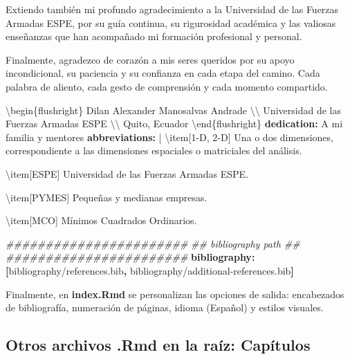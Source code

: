\documentclass[a4paper, nobind]{templates/ociamthesis}
\newenvironment{Shaded}{\begin{snugshade}}{\end{snugshade}}
\newcommand{\AttributeTok}[1]{\textcolor[rgb]{0.13,0.29,0.53}{#1}}
\newcommand{\CharTok}[1]{\textcolor[rgb]{0.31,0.60,0.02}{#1}}
\newcommand{\CommentTok}[1]{\textcolor[rgb]{0.56,0.35,0.01}{\textit{#1}}}
\newcommand{\FunctionTok}[1]{\textcolor[rgb]{0.13,0.29,0.53}{\textbf{#1}}}
\newcommand{\KeywordTok}[1]{\textcolor[rgb]{0.13,0.29,0.53}{\textbf{#1}}}
\newcommand{\NormalTok}[1]{#1}
\renewenvironment{Shaded}
{
  \vspace{10pt}%
  \begin{snugshade}%
}{%
  \end{snugshade}%
  \vspace{8pt}%
}
\begin{document}
\begin{Shaded}
\begin{Highlighting}[]
\NormalTok{  Extiendo también mi profundo agradecimiento a la Universidad de las Fuerzas Armadas ESPE, por su guía continua, su rigurosidad académica y las valiosas enseñanzas que han acompañado mi formación profesional y personal.}
  
\NormalTok{  Finalmente, agradezco de corazón a mis seres queridos por su apoyo incondicional, su paciencia y su confianza en cada etapa del camino. Cada palabra de aliento, cada gesto de comprensión y cada momento compartido.}
  
  
\NormalTok{  \textbackslash{}begin\{flushright\}}
\NormalTok{  Dilan Alexander Manosalvas Andrade \textbackslash{}\textbackslash{}}
\NormalTok{  Universidad de las Fuerzas Armadas ESPE \textbackslash{}\textbackslash{}}
\NormalTok{  Quito, Ecuador}
\NormalTok{  \textbackslash{}end\{flushright\}}
\FunctionTok{dedication}\KeywordTok{:}\AttributeTok{ A mi familia y mentores}
\FunctionTok{abbreviations}\KeywordTok{: }\CharTok{|}
\NormalTok{  \textbackslash{}item[1{-}D, 2{-}D] Una o dos dimensiones, correspondiente a las dimensiones espaciales o matriciales del análisis.}
  
\NormalTok{  \textbackslash{}item[ESPE] Universidad de las Fuerzas Armadas ESPE.}
  
\NormalTok{  \textbackslash{}item[PYMES] Pequeñas y medianas empresas.}
  
\NormalTok{  \textbackslash{}item[MCO] Mínimos Cuadrados Ordinarios.}

\CommentTok{\#\#\#\#\#\#\#\#\#\#\#\#\#\#\#\#\#\#\#\#\#\#\#}
\CommentTok{\#\# bibliography path \#\#}
\CommentTok{\#\#\#\#\#\#\#\#\#\#\#\#\#\#\#\#\#\#\#\#\#\#\#}
\FunctionTok{bibliography}\KeywordTok{:}\AttributeTok{ }\KeywordTok{[}\AttributeTok{bibliography/references.bib}\KeywordTok{,}\AttributeTok{ bibliography/additional{-}references.bib}\KeywordTok{]}
\end{Highlighting}
\end{Shaded}

Finalmente, en \textbf{index.Rmd} se personalizan las opciones de salida: encabezados de bibliografía, numeración de páginas, idioma (Español) y estilos visuales.

\subsection{\texorpdfstring{Otros archivos \textbf{.Rmd} en la raíz: Capítulos}{Otros archivos .Rmd en la raíz: Capítulos}}\label{otros-archivos-.rmd-en-la-rauxedz-capuxedtulos}
\end{document}
